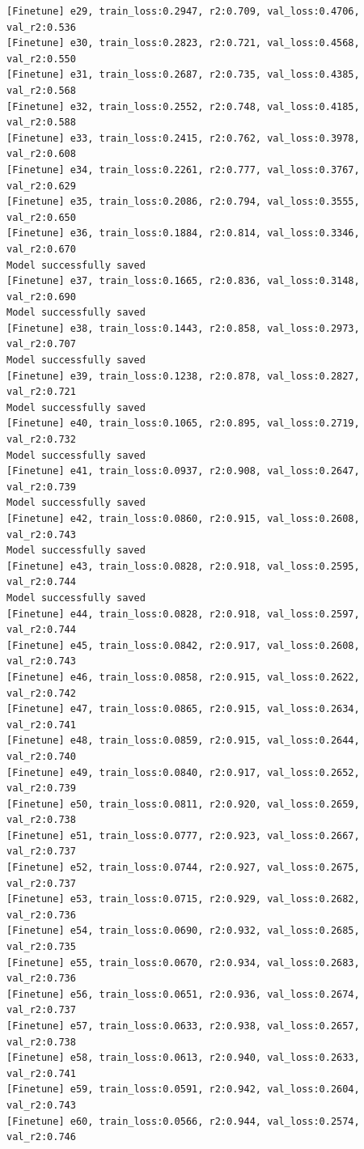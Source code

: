 \documentclass[a4paper, 12pt]{article}
\begin{document}
\begin{lstlisting}
[Finetune] e29, train_loss:0.2947, r2:0.709, val_loss:0.4706, val_r2:0.536
[Finetune] e30, train_loss:0.2823, r2:0.721, val_loss:0.4568, val_r2:0.550
[Finetune] e31, train_loss:0.2687, r2:0.735, val_loss:0.4385, val_r2:0.568
[Finetune] e32, train_loss:0.2552, r2:0.748, val_loss:0.4185, val_r2:0.588
[Finetune] e33, train_loss:0.2415, r2:0.762, val_loss:0.3978, val_r2:0.608
[Finetune] e34, train_loss:0.2261, r2:0.777, val_loss:0.3767, val_r2:0.629
[Finetune] e35, train_loss:0.2086, r2:0.794, val_loss:0.3555, val_r2:0.650
[Finetune] e36, train_loss:0.1884, r2:0.814, val_loss:0.3346, val_r2:0.670
Model successfully saved
[Finetune] e37, train_loss:0.1665, r2:0.836, val_loss:0.3148, val_r2:0.690
Model successfully saved
[Finetune] e38, train_loss:0.1443, r2:0.858, val_loss:0.2973, val_r2:0.707
Model successfully saved
[Finetune] e39, train_loss:0.1238, r2:0.878, val_loss:0.2827, val_r2:0.721
Model successfully saved
[Finetune] e40, train_loss:0.1065, r2:0.895, val_loss:0.2719, val_r2:0.732
Model successfully saved
[Finetune] e41, train_loss:0.0937, r2:0.908, val_loss:0.2647, val_r2:0.739
Model successfully saved
[Finetune] e42, train_loss:0.0860, r2:0.915, val_loss:0.2608, val_r2:0.743
Model successfully saved
[Finetune] e43, train_loss:0.0828, r2:0.918, val_loss:0.2595, val_r2:0.744
Model successfully saved
[Finetune] e44, train_loss:0.0828, r2:0.918, val_loss:0.2597, val_r2:0.744
[Finetune] e45, train_loss:0.0842, r2:0.917, val_loss:0.2608, val_r2:0.743
[Finetune] e46, train_loss:0.0858, r2:0.915, val_loss:0.2622, val_r2:0.742
[Finetune] e47, train_loss:0.0865, r2:0.915, val_loss:0.2634, val_r2:0.741
[Finetune] e48, train_loss:0.0859, r2:0.915, val_loss:0.2644, val_r2:0.740
[Finetune] e49, train_loss:0.0840, r2:0.917, val_loss:0.2652, val_r2:0.739
[Finetune] e50, train_loss:0.0811, r2:0.920, val_loss:0.2659, val_r2:0.738
[Finetune] e51, train_loss:0.0777, r2:0.923, val_loss:0.2667, val_r2:0.737
[Finetune] e52, train_loss:0.0744, r2:0.927, val_loss:0.2675, val_r2:0.737
[Finetune] e53, train_loss:0.0715, r2:0.929, val_loss:0.2682, val_r2:0.736
[Finetune] e54, train_loss:0.0690, r2:0.932, val_loss:0.2685, val_r2:0.735
[Finetune] e55, train_loss:0.0670, r2:0.934, val_loss:0.2683, val_r2:0.736
[Finetune] e56, train_loss:0.0651, r2:0.936, val_loss:0.2674, val_r2:0.737
[Finetune] e57, train_loss:0.0633, r2:0.938, val_loss:0.2657, val_r2:0.738
[Finetune] e58, train_loss:0.0613, r2:0.940, val_loss:0.2633, val_r2:0.741
[Finetune] e59, train_loss:0.0591, r2:0.942, val_loss:0.2604, val_r2:0.743
[Finetune] e60, train_loss:0.0566, r2:0.944, val_loss:0.2574, val_r2:0.746

\end{lstlisting}
\end{document}
